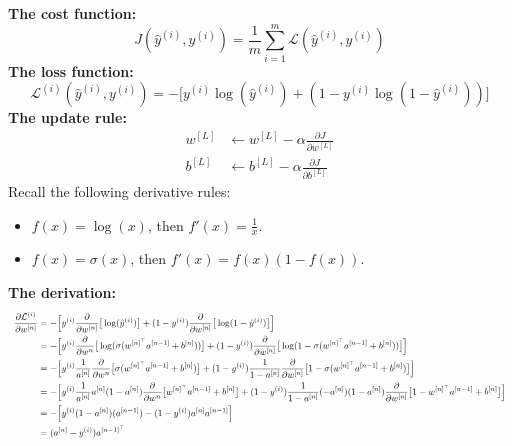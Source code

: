 \documentclass[11pt]{article}
\begin{document}
\begin{note_special}
\textbf{The cost function:}
$$
J(\hat{y}^{(i)},y^{(i)})=\frac{1}{m}\sum_{i=1}^{m}\mathcal{L}(\hat{y}^{(i)},y^{(i)})
$$
\textbf{The loss function:}
$$
\mathcal{L}^{(i)}(\hat{y}^{(i)},y^{(i)})=-\Big[y^{(i)}\log(\hat{y}^{(i)})+(1-y^{(i)}\log(1-\hat{y}^{(i)}))\Big]
$$
\textbf{The update rule:}
\begin{align*}
w^{[L]}&\leftarrow w^{[L]}-\alpha\frac{\partial J}{\partial w^{[L]}} \\
b^{[L]}&\leftarrow b^{[L]}-\alpha\frac{\partial J}{\partial b^{[L]}}
\end{align*}
Recall the following derivative rules:
\begin{itemize}
    \item $f(x)=\log(x)$, then $f'(x)=\frac{1}{x}$.
    \item $f(x)=\sigma(x)$, then $f'(x)=f(x)(1-f(x))$.  
\end{itemize}
\textbf{The derivation:}
\begin{equation*}
    \resizebox{1.02\textwidth}{!}{%
        $\begin{aligned}
            \frac{\partial\mathcal{L}^{(i)}}{\partial w^{[n]}}&=-\Big[y^{(i)}\frac{\partial}{\partial w^{[n]}}\big[\log(\hat{y}^{(i)})\big]+(1-y^{(i)})\frac{\partial}{\partial w^{[n]}}\big[\log(1-\hat{y}^{(i)})\big]\Big] \\
            &=-\Big[y^{(i)}\frac{\partial}{\partial w^{n}}\big[\log(\sigma(w^{[n]^{\top}}a^{[n-1]}+b^{[n]}))\big]+(1-y^{(i)})\frac{\partial}{\partial w^{[n]}}\big[\log(1-\sigma(w^{[n]^{\top}}a^{[n-1]}+b^{[n]}))\big]\Big] \\
            &=-\Big[y^{(i)}\frac{1}{a^{[n]}}\frac{\partial}{\partial w^{n}}\big[\sigma(w^{[n]^{\top}}a^{[n-1]}+b^{[n]})\big]+(1-y^{(i)})\frac{1}{1-a^{[n]}}\frac{\partial}{\partial w^{[n]}}\big[1-\sigma(w^{[n]^{\top}}a^{[n-1]}+b^{[n]})\big]\Big] \\
            &=-\Big[y^{(i)}\frac{1}{a^{[n]}}a^{[n]}(1-a^{[n]})\frac{\partial}{\partial w^{n}}\big[w^{[n]^{\top}}a^{[n-1]}+b^{[n]}\big]+(1-y^{(i)})\frac{1}{1-a^{[n]}}(-a^{[n]})(1-a^{[n]})\frac{\partial}{\partial w^{[n]}}\big[1-w^{[n]^{\top}}a^{[n-1]}+b^{[n]}\big]\Big] \\
            &=-\Big[y^{(i)}(1-a^{[n]})(a^{[n-1]})-(1-y^{(i)})a^{[n]}a^{[n-1]}\Big] \\
            &=(a^{[n]}-y^{(i)})a^{[n-1]^{\top}}
        \end{aligned}$%
    }
\end{equation*}

\end{note_special}
\end{document}
